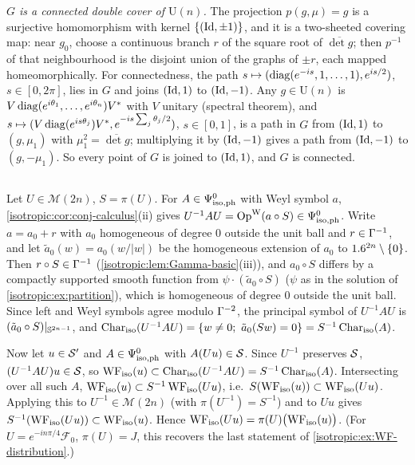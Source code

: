 \emph{$G$ is a connected double cover of $\mathrm U(n)$.} The projection
$p(g,\mu)=g$ is a surjective homomorphism with kernel $\{(\operatorname{Id},\pm1)\}$, and it is a
two-sheeted covering map: near $g_0$, choose a continuous branch $r$ of the
square root of $\overline{\det g}$; then $p^{-1}$ of that neighbourhood is the
disjoint union of the graphs of $\pm r$, each mapped homeomorphically. For
connectedness, the path $s\mapsto(\operatorname{diag}(e^{-is},1,\dots,1),e^{is/2})$,
$s\in[0,2\pi]$, lies in $G$ and joins $(\operatorname{Id},1)$ to $(\operatorname{Id},-1)$. Any $g\in\mathrm U(n)$
is $V\operatorname{diag}(e^{i\theta_1},\dots,e^{i\theta_n})V^*$ with $V$ unitary (spectral
theorem), and $s\mapsto(V\operatorname{diag}(e^{is\theta_j})V^*,e^{-is\sum_j\theta_j/2})$, $s\in[0,1]$,
is a path in $G$ from $(\operatorname{Id},1)$ to $(g,\mu_1)$ with $\mu_1^2=\overline{\det g}$;
multiplying it by $(\operatorname{Id},-1)$ gives a path from $(\operatorname{Id},-1)$ to $(g,-\mu_1)$. So
every point of $G$ is joined to $(\operatorname{Id},1)$, and $G$ is connected.

\subsection*{}

Let $U\in\mathcal M(2n)$, $S=\pi(U)$. For $A\in\Psi^{0}_{\mathrm{iso,ph}}$ with Weyl symbol $a$,
\cref{isotropic:cor:conj-calculus}(ii) gives $U^{-1}AU=\operatorname{Op}^{\mathrm{W}}(a\circ S)\in\Psi^{0}_{\mathrm{iso,ph}}$.
Write $a=a_0+r$ with $a_0$ homogeneous of degree $0$ outside the unit ball and
$r\in\Gamma^{-1}$, and let $\tilde a_0(w)=a_0(w/|w|)$ be the homogeneous extension of
$a_0$ to $1.6^{2n}\setminus\{0\}$. Then $r\circ S\in\Gamma^{-1}$
(\cref{isotropic:lem:Gamma-basic}(iii)), and $a_0\circ S$ differs by a compactly
supported smooth function from $\psi\cdot(\tilde a_0\circ S)$ ($\psi$ as in the
solution of \cref{isotropic:ex:partition}), which is homogeneous of degree $0$
outside the unit ball. Since left and
Weyl symbols agree modulo $\Gamma^{-2}$, the principal symbol of $U^{-1}AU$ is
$(\tilde a_0\circ S)|_{\mathbb{S}^{2n-1}}$, and
$\operatorname{Char}_{\mathrm{iso}}(U^{-1}AU)=\{w\ne0;\ \tilde a_0(Sw)=0\}=S^{-1}\operatorname{Char}_{\mathrm{iso}}(A)$.

Now let $u\in\mathcal{S}'$ and $A\in\Psi^{0}_{\mathrm{iso,ph}}$ with $A(Uu)\in\mathcal{S}$. Since $U^{-1}$
preserves $\mathcal{S}$, $(U^{-1}AU)u\in\mathcal{S}$, so
$\operatorname{WF}_{\mathrm{iso}}(u)\subset\operatorname{Char}_{\mathrm{iso}}(U^{-1}AU)=S^{-1}\operatorname{Char}_{\mathrm{iso}}(A)$. Intersecting over
all such $A$, $\operatorname{WF}_{\mathrm{iso}}(u)\subset S^{-1}\operatorname{WF}_{\mathrm{iso}}(Uu)$, i.e.\
$S(\operatorname{WF}_{\mathrm{iso}}(u))\subset\operatorname{WF}_{\mathrm{iso}}(Uu)$. Applying this to $U^{-1}\in\mathcal M(2n)$ (with
$\pi(U^{-1})=S^{-1}$) and to $Uu$ gives
$S^{-1}(\operatorname{WF}_{\mathrm{iso}}(Uu))\subset\operatorname{WF}_{\mathrm{iso}}(u)$. Hence $\operatorname{WF}_{\mathrm{iso}}(Uu)=\pi(U)\bigl(\operatorname{WF}_{\mathrm{iso}}(u)\bigr)$.
(For $U=e^{-in\pi/4}\mathcal F_0$, $\pi(U)=J$, this recovers the last statement of
\cref{isotropic:ex:WF-distribution}.)
